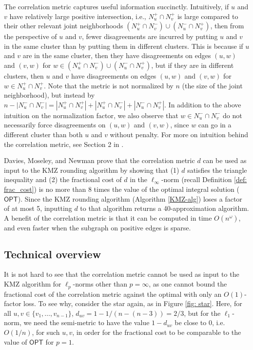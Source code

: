 The correlation metric captures useful information  succinctly.
Intuitively, if $u$ and $v$ have relatively large positive intersection, i.e., $N_u^+ \cap N_v^+$ is large compared to their other relevant joint neighborhoods $\left (N_u^+ \cap N_v^-\right ) \cup \left ( N_u^- \cap N_v^+\right )$, then from the perspective of $u$ and $v$,
fewer disagreements are incurred by putting
$u$ and $v$ in the same cluster than by putting them in different clusters.
This is because if $u$ and $v$ are in the same cluster, then they have disagreements on edges $(u,w)$ and $(v,w)$ for $w \in \left (N_u^+ \cap N_v^- \right )\cup \left (N_u^- \cap N_v^+\right )$, but if they are in different clusters, then $u$ and $v$ have disagreements on edges $(u,w)$ and $(v,w)$ for  $w \in N_u^+ \cap N_v^+$. 
Note that the metric is not normalized by $n$ (the size of the joint neighborhood), but instead by $n-| N_u^- \cap N_v^- | = |N_u^+ \cap N_v^+| + |N_u^+ \cap N_v^-| + |N_u^- \cap N_v^+|$.
In addition to the above intuition on the normalization factor, we also observe that $w \in N_u^- \cap N_v^- $ do not necessarily force disagreements on $(u,w)$ and $(v,w)$, since $w$ can go in a different cluster than both $u$ and $v$ without penalty.
For more on intuition behind the correlation metric, see Section 2 in \cite{DMN23}.

Davies, Moseley, and Newman \citeyearpar{DMN23} prove that the correlation metric $d$ can be used as input to the KMZ rounding algorithm by showing that (1) $d$ satisfies the triangle inequality and (2) the fractional cost of $d$ in the $\ell_{\infty}$-norm (recall Definition \ref{def: frac_cost}) is no more than 8 times the value of the optimal integral solution ($\textsf{OPT}$). Since the KMZ rounding algorithm (Algorithm \ref{KMZ-alg}) loses a factor of at most 5, inputting $d$ to that algorithm returns a 40-approximation algorithm. 
A benefit of the correlation metric is that it can be computed in time $O(n^{\omega})$, and even faster when the subgraph on positive edges is sparse. 




\subsection{Technical overview}
 It is not hard to see that the correlation metric cannot be used as input to the KMZ algorithm for $\ell_p$-norms other than $p = \infty$, as one cannot bound the fractional cost of the correlation metric against the optimal with only an $O(1)$-factor loss. To see why, consider the star again, as in Figure \ref{fig: star}. Here, for all $u,v \in \{v_1,\ldots,v_{n-1}\}$, $d_{uv} = 1- 1/(n-(n-3)) = 2/3$, but for the $\ell_1$-norm, we need the semi-metric to have the value $1-d_{uv}$ be close to 0, i.e. $O(1/n)$, for such $u,v$, in order for the fractional cost to be comparable to the value of $\textsf{OPT}$ for $p=1$. 


